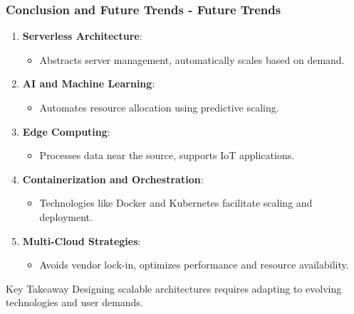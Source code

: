 \documentclass{beamer}
\begin{document}
\begin{frame}[fragile]
    \frametitle{Conclusion and Future Trends - Future Trends}
    \begin{enumerate}
        \item \textbf{Serverless Architecture}:
        \begin{itemize}
            \item Abstracts server management, automatically scales based on demand.
        \end{itemize}
        
        \item \textbf{AI and Machine Learning}:
        \begin{itemize}
            \item Automates resource allocation using predictive scaling.
        \end{itemize}
        
        \item \textbf{Edge Computing}:
        \begin{itemize}
            \item Processes data near the source, supports IoT applications.
        \end{itemize}
        
        \item \textbf{Containerization and Orchestration}:
        \begin{itemize}
            \item Technologies like Docker and Kubernetes facilitate scaling and deployment.
        \end{itemize}
        
        \item \textbf{Multi-Cloud Strategies}:
        \begin{itemize}
            \item Avoids vendor lock-in, optimizes performance and resource availability.
        \end{itemize}
    \end{enumerate}

    \begin{block}{Key Takeaway}
        Designing scalable architectures requires adapting to evolving technologies and user demands.
    \end{block}
\end{frame}
\end{document}

